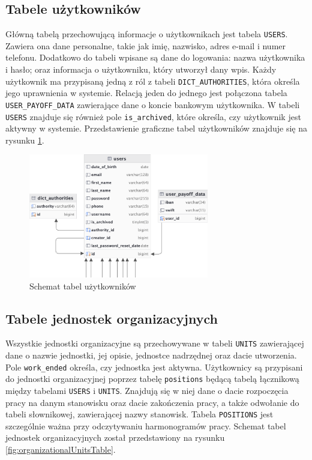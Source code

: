 \subsection{Tabele użytkowników}

Główną tabelą przechowującą informacje o użytkownikach jest tabela \texttt{USERS}. Zawiera ona dane personalne, takie jak imię, nazwisko, adres e-mail i numer telefonu. Dodatkowo do tabeli wpisane są dane do logowania: nazwa użytkownika i hasło; oraz informacja o użytkowniku, który utworzył dany wpis. Każdy użytkownik ma przypisaną jedną z ról z tabeli \texttt{DICT\_AUTHORITIES}, która określa jego uprawnienia w systemie. Relacją jeden do jednego jest połączona tabela \texttt{USER\_PAYOFF\_DATA} zawierające dane o koncie bankowym użytkownika. W tabeli \texttt{USERS} znajduje się również pole \texttt{is\_archived}, które określa, czy użytkownik jest aktywny w systemie. Przedstawienie graficzne tabel użytkowników znajduje się na rysunku \ref{fig:usersTable}.

\begin{figure}[H]
    \centering
    \includegraphics[width=0.7\textwidth]{graf/usersTable.png}
    \caption{Schemat tabel użytkowników}
    \label{fig:usersTable}
\end{figure}

\subsection{Tabele jednostek organizacyjnych}

Wszystkie jednostki organizacyjne są przechowywane w tabeli \texttt{UNITS} zawierającej dane o nazwie jednostki, jej opisie, jednostce nadrzędnej oraz dacie utworzenia. Pole \texttt{work\_ended} określa, czy jednostka jest aktywna. Użytkownicy są przypisani do jednostki organizacyjnej poprzez tabelę \texttt{positions} będącą tabelą łącznikową między tabelami \texttt{USERS} i \texttt{UNITS}. Znajdują się w niej dane o dacie rozpoczęcia pracy na danym stanowisku oraz dacie zakończenia pracy, a także odwołanie do tabeli słownikowej, zawierającej nazwy stanowisk. Tabela \texttt{POSITIONS} jest szczególnie ważna przy odczytywaniu harmonogramów pracy. Schemat tabel jednostek organizacyjnych został przedstawiony na rysunku \ref{fig:organizationalUnitsTable}.

